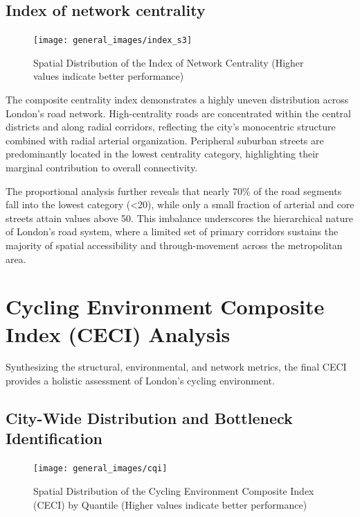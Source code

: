\documentclass[
  12pt,
  oneside]{book}
\begin{document}
\subsection{Index of network centrality}\label{index-of-network-centrality}

\begin{figure}

{\centering \texttt{[image: general\_images/index\_s3]} 

}

\caption{Spatial Distribution of the Index of Network Centrality (Higher values indicate better performance)}\label{fig:indexs3}
\end{figure}

The composite centrality index demonstrates a highly uneven distribution across London's road network. High-centrality roads are concentrated within the central districts and along radial corridors, reflecting the city's monocentric structure combined with radial arterial organization. Peripheral suburban streets are predominantly located in the lowest centrality category, highlighting their marginal contribution to overall connectivity.

The proportional analysis further reveals that nearly 70\% of the road segments fall into the lowest category (\textless20), while only a small fraction of arterial and core streets attain values above 50. This imbalance underscores the hierarchical nature of London's road system, where a limited set of primary corridors sustains the majority of spatial accessibility and through-movement across the metropolitan area.

\section{Cycling Environment Composite Index (CECI) Analysis}\label{cycling-environment-composite-index-ceci-analysis}

Synthesizing the structural, environmental, and network metrics, the final CECI provides a holistic assessment of London's cycling environment.

\subsection{City-Wide Distribution and Bottleneck Identification}\label{city-wide-distribution-and-bottleneck-identification}

\begin{figure}

{\centering \texttt{[image: general\_images/cqi]} 

}

\caption{Spatial Distribution of the Cycling Environment Composite Index (CECI) by Quantile (Higher values indicate better performance)}\label{fig:cqi}
\end{figure}
\end{document}
